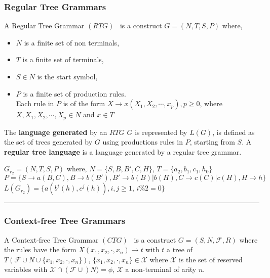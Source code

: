 \subsubsection{Regular Tree Grammars}
A Regular Tree Grammar $(RTG)$~\cite{hubert}  is a construct
      $G=(N,T,S,P)$ where,
   \begin{itemize}%
  \item $N$ is a finite set of non terminals,
  \item $T$ is a finite set of terminals,
  \item $S \in N$ is the start symbol,
  \item $P$ is a finite set of production rules.\\
Each rule in $P$ is of the form $X\rightarrow x(X_1,X_2,\cdots ,x_p),p\geq 0$, where
$X,X_1,X_2,\cdots ,X_p\in N$ and $x\in T$
  \end{itemize}
The \textbf{ language generated} by an $RTG$ $G$ is represented by $L(G)$, is defined as
the set of trees generated by $G$ using productions rules in $P$, starting from $S$.
 A \textbf{regular tree language} is a language generated by a regular tree grammar.

\begin{example}
   $G_{r_2}=(N,T,S,P)$ where, 
        $  N = \{S,B,B',C,H\}$,  $T = \{a_2,b_1,c_1,h_0\}$\\
         $ P = \{
                S \rightarrow  a(B,C),
                B \rightarrow  b(B'),
                B' \rightarrow  b(B)|b(H),  
                C \rightarrow  c(C)|c(H),
                H \rightarrow  h  
        \}$\\
 $L(G_{r_2})=\{a(b^i(h),c^j(h)),i,j\ge 1\mbox{, } i\%2 =0\}$\\
\noindent \rule{\textwidth}{1pt}
\end{example}


\subsubsection{Context-free Tree Grammars}
A Context-free Tree Grammar $(CTG)$~\cite{hubert}  is a construct $G=(S,N,\mathcal{F},R)$ where the
rules have the form $X(x_1,x_2,\cdot,x_n)\rightarrow t$ with $t$ a tree of $T(\mathcal{F}\cup N\cup \{x_1,x_2,\cdot ,x_n\})$, 
$\{x_1,x_2,\cdot ,x_n\}\in \mathcal{X}$ where $\mathcal{X}$ is the set of reserved variables with $\mathcal{X}\cap(\mathcal{F}\cup)N)=\phi$, 
$\mathcal{X}$ a non-terminal of arity $n$.

